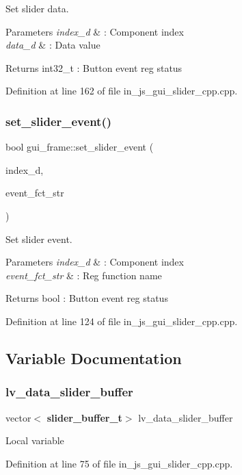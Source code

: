 Set slider data. 


\begin{DoxyParams}{Parameters}
{\em index\+\_\+d} & \+: Component index \\
\hline
{\em data\+\_\+d} & \+: Data value \\
\hline
\end{DoxyParams}
\begin{DoxyReturn}{Returns}
int32\+\_\+t \+: Button event reg status 
\end{DoxyReturn}


Definition at line 162 of file in\+\_\+js\+\_\+gui\+\_\+slider\+\_\+cpp.\+cpp.

\mbox{\label{group___slider_ga16761e25d91253d2e6d9c4bc90d522c5}} 
\subsubsection{set\_slider\_event()}
{\footnotesize\ttfamily bool gui\+\_\+frame\+::set\+\_\+slider\+\_\+event (\begin{DoxyParamCaption}\item[{double}]{index\+\_\+d,  }\item[{wx\+String}]{event\+\_\+fct\+\_\+str }\end{DoxyParamCaption})}



Set slider event. 


\begin{DoxyParams}{Parameters}
{\em index\+\_\+d} & \+: Component index \\
\hline
{\em event\+\_\+fct\+\_\+str} & \+: Reg function name \\
\hline
\end{DoxyParams}
\begin{DoxyReturn}{Returns}
bool \+: Button event reg status 
\end{DoxyReturn}


Definition at line 124 of file in\+\_\+js\+\_\+gui\+\_\+slider\+\_\+cpp.\+cpp.



\subsection{Variable Documentation}
\mbox{\label{group___slider_ga64813f8fbd229c0f5955687ef17c349e}} 
\subsubsection{lv\_data\_slider\_buffer}
{\footnotesize\ttfamily vector$<$\textbf{ slider\+\_\+buffer\+\_\+t}$>$ lv\+\_\+data\+\_\+slider\+\_\+buffer}

Local variable 

Definition at line 75 of file in\+\_\+js\+\_\+gui\+\_\+slider\+\_\+cpp.\+cpp.

